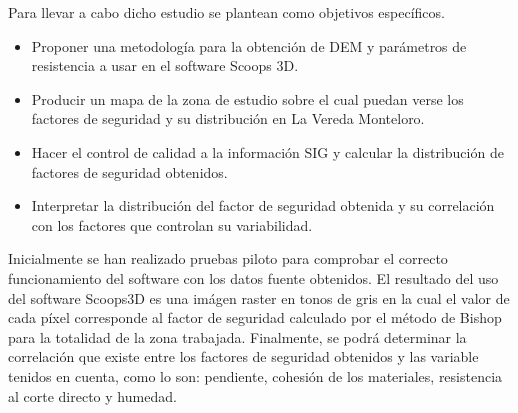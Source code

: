 Para llevar a cabo dicho estudio se plantean como objetivos espec\'ificos.

\begin{itemize}
    \item Proponer una metodolog\'ia para la obtenci\'on de DEM y par\'ametros de resistencia a usar en el software Scoops 3D.
    \item Producir un mapa de la zona de estudio sobre el cual puedan verse los factores de seguridad y su distribuci\'on en La Vereda Monteloro.
    \item Hacer el control de calidad a la informaci\'on SIG y calcular la distribuci\'on de factores de seguridad obtenidos.
    \item Interpretar la distribuci\'on del factor de seguridad obtenida y su correlaci\'on con los factores que controlan su variabilidad.
\end{itemize} 

Inicialmente se han realizado pruebas piloto para comprobar el correcto funcionamiento del software con los datos fuente obtenidos.
El resultado del uso del software Scoops3D es una im\'agen raster en tonos de gris en la cual el valor de cada p\'ixel corresponde al factor de seguridad calculado por el m\'etodo de Bishop para la totalidad de la zona trabajada. Finalmente, se podr\'a determinar la  correlaci\'on que existe entre los factores de seguridad obtenidos y las variable tenidos en cuenta, como lo son: pendiente, cohesi\'on de los materiales, resistencia al corte directo y humedad.
\\


